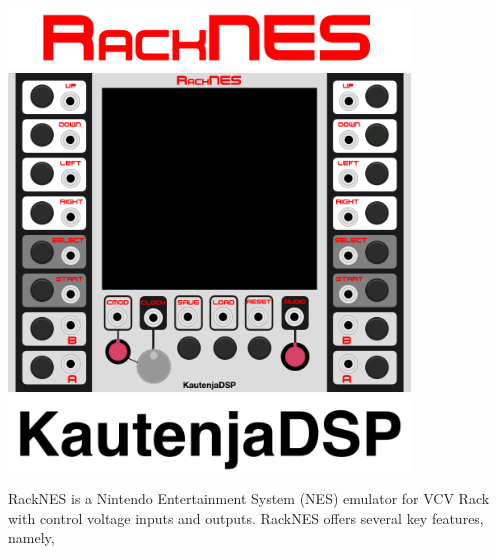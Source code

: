 \documentclass[12pt,a4paper]{article}
\begin{document}

\thispagestyle{empty}
\vspace*{\fill}
\begin{center}
\includegraphics[width=0.8\textwidth]{RackNES-Logo}
\linebreak\linebreak\linebreak\linebreak
\includegraphics[width=0.8\textwidth]{RackNES-Module}
\linebreak\linebreak\linebreak\linebreak
\includegraphics[width=0.8\textwidth]{KautenjaDSP}
\end{center}
\vspace*{\fill}
\clearpage


RackNES is a Nintendo Entertainment System (NES) emulator for VCV Rack with control voltage inputs and outputs. RackNES offers several key features, namely,
\end{document}
